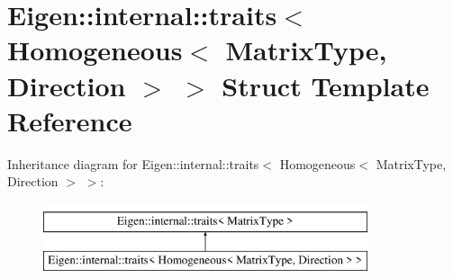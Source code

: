 \hypertarget{struct_eigen_1_1internal_1_1traits_3_01_homogeneous_3_01_matrix_type_00_01_direction_01_4_01_4}{}\section{Eigen\+::internal\+::traits$<$ Homogeneous$<$ Matrix\+Type, Direction $>$ $>$ Struct Template Reference}
\label{struct_eigen_1_1internal_1_1traits_3_01_homogeneous_3_01_matrix_type_00_01_direction_01_4_01_4}
Inheritance diagram for Eigen\+::internal\+::traits$<$ Homogeneous$<$ Matrix\+Type, Direction $>$ $>$\+:\begin{figure}[H]
\begin{center}
\leavevmode
\includegraphics[height=2.000000cm]{struct_eigen_1_1internal_1_1traits_3_01_homogeneous_3_01_matrix_type_00_01_direction_01_4_01_4}
\end{center}
\end{figure}
